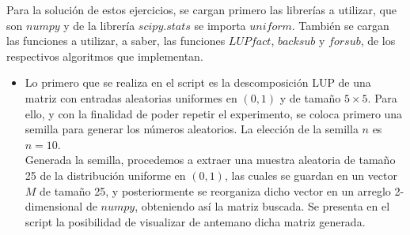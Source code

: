 \documentclass[letterpaper]{article}
\newcommand{\1}{\mathds{1}}
\theoremstyle{definition}
\theoremstyle{definition}
\theoremstyle{definition}
\theoremstyle{definition}
\theoremstyle{definition}
\begin{document}
\begin{enumerate}
    Para la solución de estos ejercicios, se cargan primero las librerías a utilizar,
    que son $numpy$ y de la librería $scipy.stats$ se importa $uniform$.
    También se cargan las funciones a utilizar, a saber, las funciones $LUPfact$, 
    $backsub$ y $forsub$, de los respectivos algoritmos que implementan.
    \newline
    \begin{itemize}
    \item Lo primero que se realiza en el script es la descomposición LUP de una matriz con
    entradas aleatorias uniformes en $(0,1)$ y de tamaño $5\times5$. Para ello, y con
    la finalidad de poder repetir el experimento, se coloca primero
    una semilla para generar los números aleatorios. La elección de la semilla $n$ es
    $n=10$.\\

    Generada la semilla, procedemos a extraer una muestra aleatoria de tamaño 25
    de la distribución uniforme en $(0,1)$, las cuales se guardan en un vector $M$
    de tamaño 25, y posteriormente se reorganiza dicho vector en un arreglo 
    2-dimensional de $numpy$, obteniendo así la matriz buscada. Se presenta en el script la
    posibilidad de visualizar de antemano dicha matriz generada.\\


\end{itemize}
\end{enumerate}
\end{document}

